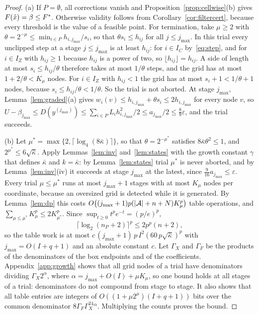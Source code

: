 \begin{proof}
(a) If $P=\emptyset$, all corrections vanish and
Proposition~\ref{prop:cellwise}(b) gives $F(\hat x)=\beta\le F^{*}$. Otherwise
validity follows from Corollary~\ref{cor:filtercert}, because every threshold
is the value of a feasible point. For termination, take $\mu\ge2$ with
$\theta=2^{-\mu}\le\min_{i\in P}h_{i,j_{\max}}/s_i$, so that
$\theta s_i\le h_{ij}$ for all $j\le j_{\max}$. In this trial every unclipped
step at a stage $j\le j_{\max}$ is at least $h_{ij}$: for $i\in I_C$
by~\eqref{eq:step}, and for $i\in I_Z$ with
$h_{ij}\ge1$ because $h_{ij}$ is a power of two, so
$\lfloor h_{ij}\rfloor=h_{ij}$. A side of length at most $s_i\le h_{ij}/\theta$
therefore takes at most $1/\theta$ steps, and the grid has at most
$1+2/\theta<K_\mu$ nodes. For $i\in I_Z$ with $h_{ij}<1$ the grid has at most
$s_i+1<1/\theta+1$ nodes, because $s_i\le h_{ij}/\theta<1/\theta$. So the
trial is not aborted. At stage $j_{\max}$, Lemma~\ref{lem:graded}(a) gives
$w_i(v)\le h_{i,j_{\max}}+\theta s_i\le2h_{i,j_{\max}}$ for every node $v$, so
$U-\beta_{j_{\max}}\le D(y^{(j_{\max})})\le\sum_{i\in P}L_ih_{i,j_{\max}}^2/2
\le a_{j_{\max}}/2\le\frac89\varepsilon$, and the trial succeeds.

(b) Let $\mu^*=\max\{2,\lceil\log_4(8\bar\kappa)\rceil\}$, so that
$\theta=2^{-\mu^*}$ satisfies $8\bar\kappa\theta^2\le1$, and
$2^{\mu^*}\le6\sqrt{\bar\kappa}$. Apply Lemmas~\ref{lem:inv}
and~\ref{lem:states} with the growth constant $\gamma$ that defines
$\bar\kappa$ and $k=\bar\kappa$: by Lemma~\ref{lem:states} trial $\mu^*$ is
never aborted, and by Lemma~\ref{lem:inv}(iv) it succeeds at stage
$j_{\max}$ at the latest, since $\frac9{16}a_{j_{\max}}\le\varepsilon$. Every
trial $\mu\le\mu^*$ runs at most $j_{\max}+1$ stages with at most $K_\mu$
nodes per coordinate, because an oversized grid is detected while it is
generated. By Lemma~\ref{lem:dp} this costs
$O\bigl((j_{\max}+1)p(\lvert \mathcal A\rvert+n+N)K_\mu^p\bigr)$ table operations,
and $\sum_{\mu\le\mu^*}K_\mu^p\le2K_{\mu^*}^p$. Since
$\sup_{t\ge0}t^pe^{-t}=(p/e)^p$,
\begin{equation}\label{eq:logabsorb}
\lceil\log_2(n_P+2)\rceil^p\le2p^p(n+2),
\end{equation}
so the table work is at most
$c\,(j_{\max}+1)\,p\,I^2(60\,p\sqrt{\bar\kappa})^p$ with
$j_{\max}=O(I+q+1)$ and an absolute constant $c$.
Let $\Gamma_X$ and $\Gamma_F$ be the products of the denominators of the box
endpoints and of the coefficients. Appendix~\ref{app:growth} shows that all
grid nodes of a trial have denominators dividing $\Gamma_X2^\alpha$, where
$\alpha=j_{\max}+O(I)+\mu K_\mu$, so one bound holds at all stages of a
trial: denominators do not compound from stage to stage. It also shows that
all table entries are integers of $O((1+\mu2^\mu)(I+q+1))$ bits over the
common denominator $8\Gamma_F\Gamma_X^24^\alpha$. Multiplying the counts
proves the bound.
\end{proof}

